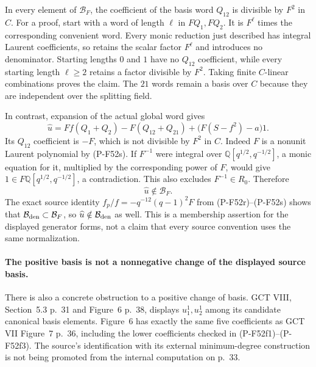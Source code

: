 \documentclass[11pt,a4paper]{article}
\begin{document}
In every element of $\mathcal B_F$, the coefficient of
the basis word $Q_{12}$ is divisible by $F^2$ in $C$.
For a proof, start with a word of length $\ell$ in
$FQ_1,FQ_2$. It is $F^\ell$ times the corresponding
convenient word. Every monic reduction just described has
integral Laurent coefficients, so retains the scalar factor
$F^\ell$ and introduces no denominator. Starting lengths
$0$ and $1$ have no $Q_{12}$ coefficient, while every
starting length $\ell\ge2$ retains a factor divisible by
$F^2$. Taking finite $C$-linear combinations proves the
claim. The $21$ words remain a basis over $C$ because
they are independent over the splitting field.

In contrast, expansion of the actual global word gives
\[
 \widehat u
    =Ff(Q_1+Q_2)-F(Q_{12}+Q_{21})
                      +\bigl(F(S-f^2)-a\bigr)1.
                                                               \tag{P-F52aq}
\]
Its $Q_{12}$ coefficient is $-F$, which is not divisible
by $F^2$ in $C$. Indeed $F$ is a nonunit Laurent polynomial
by (P-F52s). If $F^{-1}$ were integral over
$\mathbb Q[q^{1/2},q^{-1/2}]$, a monic equation for it,
multiplied by the corresponding power of $F$, would give
$1\in F\mathbb Q[q^{1/2},q^{-1/2}]$, a contradiction.
This also excludes $F^{-1}\in R_0$.
Therefore
\[
                  \widehat u\notin\mathcal B_F.
                                                               \tag{P-F52ar}
\]
The exact source identity
$f_p/f=-q^{-12}(q-1)^2F$ from (P-F52r)--(P-F52s)
shows that $\mathcal B_{\rm den}\subset\mathcal B_F$,
so $\widehat u\notin\mathcal B_{\rm den}$ as well.
This is a membership assertion for the displayed generator
forms, not a claim that every source convention uses the
same normalization.

\paragraph{The positive basis is not a nonnegative change of the displayed source basis.}
There is also a concrete obstruction to a positive change
of basis. GCT VIII, Section~5.3 p.~31 and Figure~6 p.~38,
displays $u_1^1,u_2^1$ among its candidate canonical basis
elements. Figure~6 has exactly the same five coefficients
as GCT VII Figure~7 p.~36, including the lower coefficients
checked in (P-F52f1)--(P-F52f3). The source's identification
with its external minimum-degree construction is not
being promoted from the internal computation on p.~33.
\end{document}
